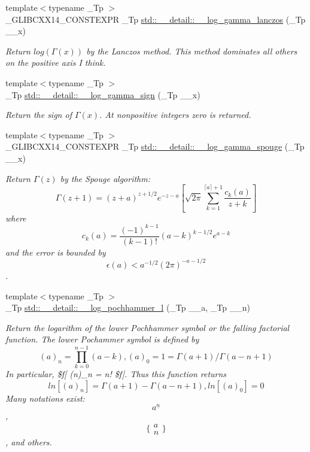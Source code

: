 \begin{DoxyCompactItemize}
{\footnotesize template$<$typename \+\_\+\+Tp $>$ }\\\+\_\+\+G\+L\+I\+B\+C\+X\+X14\+\_\+\+C\+O\+N\+S\+T\+E\+X\+P\+R \+\_\+\+Tp \hyperlink{namespacestd_1_1____detail_a45d7248fb07a96bc70546b0817a4564e}{std\+::\+\_\+\+\_\+detail\+::\+\_\+\+\_\+log\+\_\+gamma\+\_\+lanczos} (\+\_\+\+Tp \+\_\+\+\_\+x)
\begin{DoxyCompactList}\small\item\em Return $log(\Gamma(x))$ by the Lanczos method. This method dominates all others on the positive axis I think. \end{DoxyCompactList}\item 
{\footnotesize template$<$typename \+\_\+\+Tp $>$ }\\\+\_\+\+Tp \hyperlink{namespacestd_1_1____detail_ac091f187fbe5efdbc912ec9ca38ba25f}{std\+::\+\_\+\+\_\+detail\+::\+\_\+\+\_\+log\+\_\+gamma\+\_\+sign} (\+\_\+\+Tp \+\_\+\+\_\+x)
\begin{DoxyCompactList}\small\item\em Return the sign of $ \Gamma(x) $. At nonpositive integers zero is returned. \end{DoxyCompactList}\item 
{\footnotesize template$<$typename \+\_\+\+Tp $>$ }\\\+\_\+\+G\+L\+I\+B\+C\+X\+X14\+\_\+\+C\+O\+N\+S\+T\+E\+X\+P\+R \+\_\+\+Tp \hyperlink{namespacestd_1_1____detail_a79e431e1143f1e0480fdc030d839ee31}{std\+::\+\_\+\+\_\+detail\+::\+\_\+\+\_\+log\+\_\+gamma\+\_\+spouge} (\+\_\+\+Tp \+\_\+\+\_\+x)
\begin{DoxyCompactList}\small\item\em Return $\Gamma(z)$ by the Spouge algorithm\+: \[ \Gamma(z+1) = (z+a)^{z+1/2}e^{-z-a}\left[ \sqrt{2\pi} \sum_{k=1}^{\lceil a \rceil + 1}\frac{c_k(a)}{z+k}\right] \] where \[ c_k(a) = \frac{(-1)^{k-1}}{(k-1)!}(a-k)^{k-1/2}e^{a-k} \] and the error is bounded by \[ \epsilon(a) < a^{-1/2}(2\pi)^{-a-1/2} \]. \end{DoxyCompactList}\item 
{\footnotesize template$<$typename \+\_\+\+Tp $>$ }\\\+\_\+\+Tp \hyperlink{namespacestd_1_1____detail_a287ee67c3a3214ed32d161bede80fbf4}{std\+::\+\_\+\+\_\+detail\+::\+\_\+\+\_\+log\+\_\+pochhammer\+\_\+l} (\+\_\+\+Tp \+\_\+\+\_\+a, \+\_\+\+Tp \+\_\+\+\_\+n)
\begin{DoxyCompactList}\small\item\em Return the logarithm of the lower Pochhammer symbol or the falling factorial function. The lower Pochammer symbol is defined by \[ (a)_n = \prod_{k=0}^{n-1} (a - k), (a)_0 = 1 = \Gamma(a + 1) / \Gamma(a - n + 1) \] In particular, \$f\mbox{[} (n)\+\_\+n = n! \$f\mbox{]}. Thus this function returns \[ ln[(a)_n] = \Gamma(a + 1) - \Gamma(a - n + 1), ln[(a)_0] = 0 \] Many notations exist\+: \[ a^{\underline{n}} \], \[ \{ \begin{array}{c} a \\ n \end{array} \} \], and others. \end{DoxyCompactList}\item 

\end{DoxyCompactItemize}
